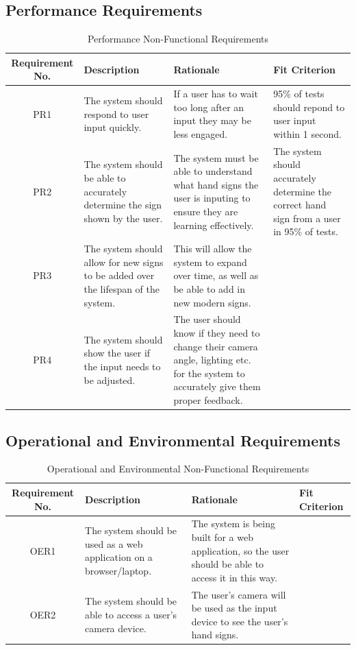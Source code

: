 \documentclass[12pt, titlepage]{article}
\begin{document}
\subsection{Performance Requirements}

\begin{table}[H]
\caption{Performance Non-Functional Requirements}
\noindent \begin{tabular}{| c | p{3cm}| p{3cm}| p{3cm}|}
\hline 
\textbf{Requirement No.} & \textbf{Description} & \textbf{Rationale} & \textbf{Fit Criterion}\\
\hline
PR1 & The system should respond to user input quickly. & If a user has to wait too long after an input they may be less engaged. & 95\% of tests should repond to user input within 1 second. \\
\hline
PR2 & The system should be able to accurately determine the sign shown by the user. & The system must be able to understand what hand signs the user is inputing to ensure they are learning effectively. & The system should accurately determine the correct hand sign from a user in 95\% of tests. \\
\hline
PR3 & The system should allow for new signs to be added over the lifespan of the system. & This will allow the system to expand over time, as well as be able to add in new modern signs. & \\
\hline
PR4 & The system should show the user if the input needs to be adjusted. & The user should know if they need to change their camera angle, lighting etc. for the system to accurately give them proper feedback. & \\

\bottomrule
\end{tabular}
\end{table}

\subsection{Operational and Environmental Requirements}

\begin{table}[H]
\caption{Operational and Environmental Non-Functional Requirements}
\noindent \begin{tabular}{| c | p{3cm}| p{3cm}| p{3cm}|}
\hline 
\textbf{Requirement No.} & \textbf{Description} & \textbf{Rationale} & \textbf{Fit Criterion}\\
\hline
OER1 & The system should be used as a web application on a browser/laptop. & The system is being built for a web application, so the user should be able to access it in this way. & \\
\hline
OER2 & The system should be able to access a user's camera device. & The user's camera will be used as the input device to see the user's hand signs. & \\
\bottomrule
\end{tabular}
\end{table}
\end{document}
